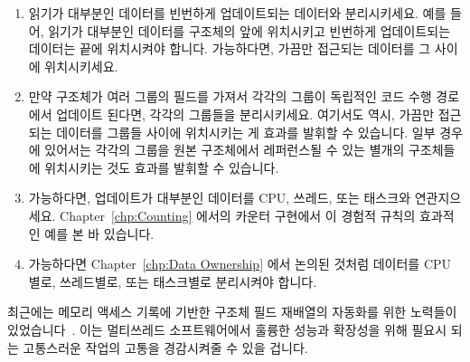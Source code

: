 \begin{enumerate}
\item	읽기가 대부분인 데이터를 빈번하게 업데이트되는 데이터와 분리시키세요.
	예를 들어, 읽기가 대부분인 데이터를 구조체의 앞에 위치시키고 빈번하게
	업데이트되는 데이터는 끝에 위치시켜야 합니다.
	가능하다면, 가끔만 접근되는 데이터를 그 사이에 위치시키세요.
\item	만약 구조체가 여러 그룹의 필드를 가져서 각각의 그룹이 독립적인 코드
	수행 경로에서 업데이트 된다면, 각각의 그룹들을 분리시키세요.
	여기서도 역시, 가끔만 접근되는 데이터를 그룹들 사이에 위치시키는 게
	효과를 발휘할 수 있습니다.
	일부 경우에 있어서는 각각의 그룹을 원본 구조체에서 레퍼런스될 수 있는
	별개의 구조체들에 위치시키는 것도 효과를 발휘할 수 있습니다.
\item	가능하다면, 업데이트가 대부분인 데이터를 CPU, 쓰레드, 또는 태스크와
	연관지으세요.
	Chapter~\ref{chp:Counting} 에서의 카운터 구현에서 이 경험적 규칙의
	효과적인 예를 본 바 있습니다.
\item	가능하다면 Chapter~\ref{chp:Data Ownership} 에서 논의된 것처럼 데이터를
	CPU 별로, 쓰레드별로, 또는 태스크별로 분리시켜야 합니다.

\end{enumerate}

최근에는 메모리 액세스 기록에 기반한 구조체 필드 재배열의 자동화를 위한
노력들이 있었습니다~\cite{Golovanevsky:2010:TDL:2174824.2174835}.
이는 멀티쓰레드 소프트웨어에서 훌륭한 성능과 확장성을 위해 필요시 되는
고통스러운 작업의 고통을 경감시켜줄 수 있을 겁니다.

